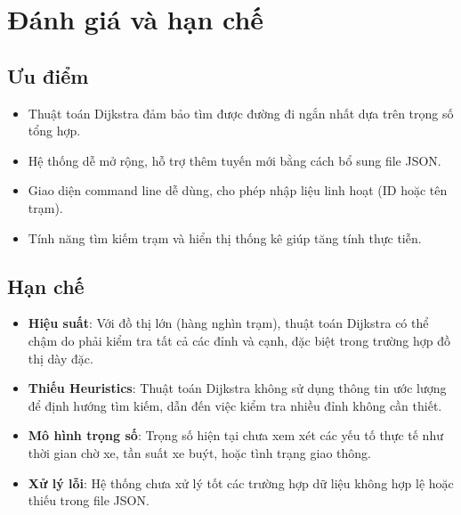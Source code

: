 \documentclass[a4paper,12pt]{article}
\begin{document}
\section{Đánh giá và hạn chế}
\subsection{Ưu điểm}
\begin{itemize}
    \item Thuật toán Dijkstra đảm bảo tìm được đường đi ngắn nhất dựa trên trọng số tổng hợp.
    \item Hệ thống dễ mở rộng, hỗ trợ thêm tuyến mới bằng cách bổ sung file JSON.
    \item Giao diện command line dễ dùng, cho phép nhập liệu linh hoạt (ID hoặc tên trạm).
    \item Tính năng tìm kiếm trạm và hiển thị thống kê giúp tăng tính thực tiễn.
\end{itemize}

\subsection{Hạn chế}
\begin{itemize}
    \item \textbf{Hiệu suất}: Với đồ thị lớn (hàng nghìn trạm), thuật toán Dijkstra có thể chậm do phải kiểm tra tất cả các đỉnh và cạnh, đặc biệt trong trường hợp đồ thị dày đặc.
    \item \textbf{Thiếu Heuristics}: Thuật toán Dijkstra không sử dụng thông tin ước lượng để định hướng tìm kiếm, dẫn đến việc kiểm tra nhiều đỉnh không cần thiết.
    \item \textbf{Mô hình trọng số}: Trọng số hiện tại chưa xem xét các yếu tố thực tế như thời gian chờ xe, tần suất xe buýt, hoặc tình trạng giao thông.
    \item \textbf{Xử lý lỗi}: Hệ thống chưa xử lý tốt các trường hợp dữ liệu không hợp lệ hoặc thiếu trong file JSON.
\end{itemize}
\end{document}

